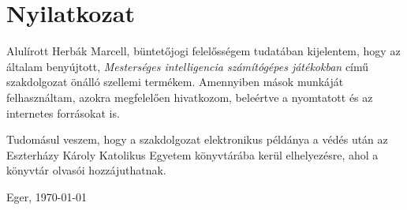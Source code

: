 \documentclass{thesis-ekf}
\begin{document}
\chapter*{Nyilatkozat}

Alulírott Herbák Marcell, büntetőjogi felelősségem tudatában kijelentem, hogy az általam benyújtott, \emph{Mesterséges intelligencia számítógépes játékokban} című szakdolgozat önálló szellemi termékem. Amennyiben mások munkáját felhasználtam, azokra megfelelően hivatkozom, beleértve a nyomtatott és az internetes forrásokat is.

Tudomásul veszem, hogy a szakdolgozat elektronikus példánya a védés után az Eszterházy Károly Katolikus Egyetem könyvtárába kerül elhelyezésre, ahol a könyvtár olvasói hozzájuthatnak.

\bigskip
\begin{flushleft}
Eger, \today
\end{flushleft}

\medskip
\begin{flushright}
\end{flushright}

%
\end{document}
